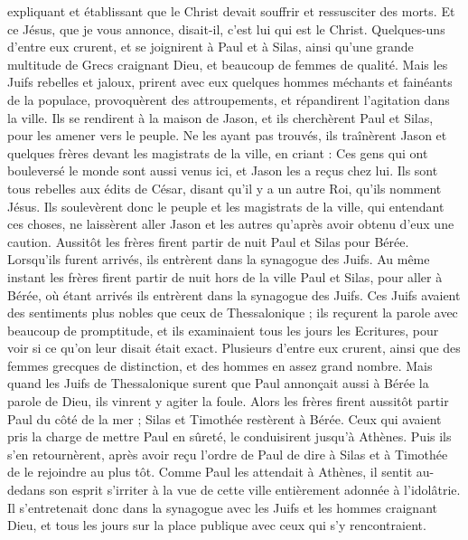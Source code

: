 \begin{multicols}{2}
expliquant et établissant que le Christ devait souffrir et ressusciter des morts. Et ce Jésus, que je vous annonce, disait-il, c'est lui qui est le Christ.
Quelques-uns d'entre eux crurent, et se joignirent à Paul et à Silas, ainsi qu'une grande multitude de Grecs craignant Dieu, et beaucoup de femmes de qualité.
Mais les Juifs rebelles et jaloux, prirent avec eux quelques hommes méchants et fainéants de la populace, provoquèrent des attroupements, et répandirent l'agitation dans la ville. Ils se rendirent à la maison de Jason, et ils cherchèrent Paul et Silas, pour les amener vers le peuple.
Ne les ayant pas trouvés, ils traînèrent Jason et quelques frères devant les magistrats de la ville, en criant : Ces gens qui ont bouleversé le monde sont aussi venus ici, et Jason les a reçus chez lui.
Ils sont tous rebelles aux édits de César, disant qu'il y a un autre Roi, qu'ils nomment Jésus.
Ils soulevèrent donc le peuple et les magistrats de la ville, qui entendant ces choses,
ne laissèrent aller Jason et les autres qu'après avoir obtenu d'eux une caution. Aussitôt les frères firent partir de nuit Paul et Silas pour Bérée. Lorsqu'ils furent arrivés, ils entrèrent dans la synagogue des Juifs.
Au même instant les frères firent partir de nuit hors de la ville Paul et Silas, pour aller à Bérée, où étant arrivés ils entrèrent dans la synagogue des Juifs.
Ces Juifs avaient des sentiments plus nobles que ceux de Thessalonique ; ils reçurent la parole avec beaucoup de promptitude, et ils examinaient tous les jours les Ecritures, pour voir si ce qu'on leur disait était exact.
Plusieurs d'entre eux crurent, ainsi que des femmes grecques de distinction, et des hommes en assez grand nombre.
Mais quand les Juifs de Thessalonique surent que Paul annonçait aussi à Bérée la parole de Dieu, ils vinrent y agiter la foule.
Alors les frères firent aussitôt partir Paul du côté de la mer ; Silas et Timothée restèrent à Bérée.
Ceux qui avaient pris la charge de mettre Paul en sûreté, le conduisirent jusqu'à Athènes. Puis ils s'en retournèrent, après avoir reçu l'ordre de Paul de dire à Silas et à Timothée de le rejoindre au plus tôt.
Comme Paul les attendait à Athènes, il sentit au-dedans son esprit s'irriter à la vue de cette ville entièrement adonnée à l'idolâtrie.
Il s'entretenait donc dans la synagogue avec les Juifs et les hommes craignant Dieu, et tous les jours sur la place publique avec ceux qui s'y rencontraient.

\end{multicols}
